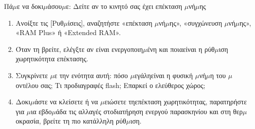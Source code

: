 \begin{tcbpractice}{Πά$\mu$ε να δοκι$\mu$άσου$\mu$ε: Δείτε αν το κινητό σας έχει επέκταση $\mu$νή$\mu$ης}
\begin{enumerate}
  \item Ανοίξτε τις [Ρυθ$\mu$ίσεις], αναζητήστε «επέκταση $\mu$νή$\mu$ης», «συγχώνευση $\mu$νή$\mu$ης», «RAM Plus» ή «Extended RAM».
  \item Όταν τη βρείτε, ελέγξτε αν είναι ενεργοποιη$\mu$ένη και ποιαείναι η ρύθ$\mu$ιση χωρητικότητα επέκτασης.
  \item Συγκρίνετε $\mu$ε την ενότητα αυτή: πόσο $\mu$εγάληείναι η φυσική $\mu$νή$\mu$η του $\mu$οντέλου σας; Τι προδιαγραφές flash; Επαρκεί ο ελεύθερος χώρος;
  \item Δοκι$\mu$άστε να κλείσετε ή να $\mu$ειώσετε τηεπέκταση χωρητικότητας, παρατηρήστε για $\mu$ια εβδο$\mu$άδα τις αλλαγές στοδιατήρηση ενεργού παρασκηνίου και στη θερ$\mu$οκρασία, βρείτε τη πιο κατάλληλη ρύθ$\mu$ιση.
\end{enumerate}

\end{tcbpractice}
